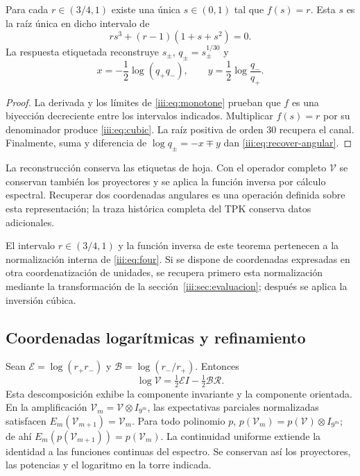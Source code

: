 \begin{theorem}
Para cada $r\in(3/4,1)$ existe una única $s\in(0,1)$ tal que $f(s)=r$.
Esta $s$ es la raíz única en dicho intervalo de
\begin{equation}
 r s^3+(r-1)(1+s+s^2)=0.
 \label{iii:eq:cubic}
\end{equation}
La respuesta etiquetada reconstruye $s_\pm$, $q_\pm=s_\pm^{1/30}$ y
\begin{equation}
 x=-\frac12\log(q_+q_-),\qquad
 y=\frac12\log\frac{q_-}{q_+}.
 \label{iii:eq:recover-angular}
\end{equation}
\end{theorem}
\begin{proof}
La derivada y los límites de \eqref{iii:eq:monotone} prueban que $f$ es una
biyección decreciente entre los intervalos indicados. Multiplicar $f(s)=r$
por su denominador produce \eqref{iii:eq:cubic}. La raíz positiva de orden
$30$ recupera el canal. Finalmente, suma y diferencia de
$\log q_\pm=-x\mp y$ dan \eqref{iii:eq:recover-angular}.
\end{proof}

La reconstrucción conserva las etiquetas de hoja. Con el operador completo
$\mathcal V$ se conservan también los proyectores y se aplica la función
inversa por cálculo espectral. Recuperar dos coordenadas angulares es una
operación definida sobre esta representación; la traza histórica completa
del TPK conserva datos adicionales.

El intervalo $r\in(3/4,1)$ y la función inversa de este teorema pertenecen
a la normalización interna de \eqref{iii:eq:four}. Si se dispone de
coordenadas expresadas en otra coordenatización de unidades, se recupera primero
esta normalización mediante la transformación de la
sección~\ref{iii:sec:evaluacion}; después se aplica la inversión cúbica.



\subsection{Coordenadas logarítmicas y refinamiento}

Sean $\mathcal E=\log(r_+r_-)$ y $\mathcal B=\log(r_-/r_+)$. Entonces
\begin{equation}
 \log\mathcal V=\tfrac12\mathcal E I-\tfrac12\mathcal B\mathcal R.
 \label{iii:eq:logvac}
\end{equation}
Esta descomposición exhibe la componente invariante y la componente orientada.
En la amplificación $\mathcal V_m=\mathcal V\otimes I_{9^m}$, las
expectativas parciales normalizadas satisfacen
$E_m(\mathcal V_{m+1})=\mathcal V_m$. Para todo polinomio $p$,
$p(\mathcal V_m)=p(\mathcal V)\otimes I_{9^m}$; de ahí
$E_m(p(\mathcal V_{m+1}))=p(\mathcal V_m)$. La continuidad uniforme
extiende la identidad a las funciones continuas del espectro. Se conservan
así los proyectores, las potencias y el logaritmo en la torre indicada.

